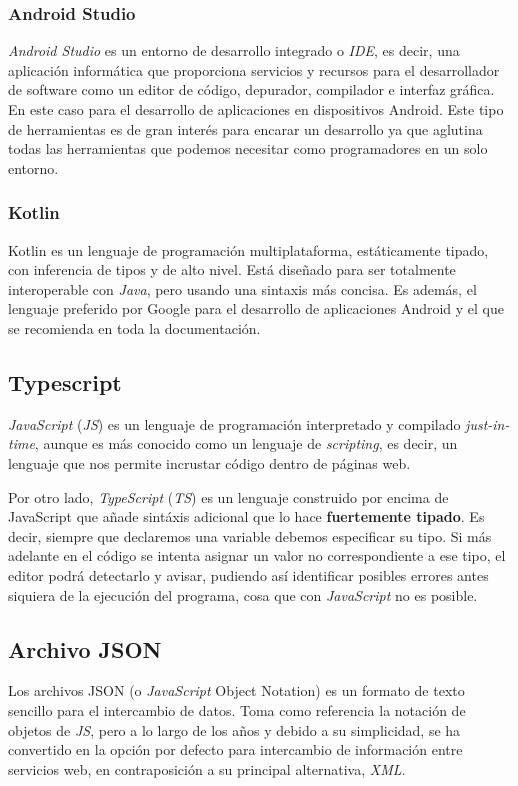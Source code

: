 \subsubsection{Android Studio}
\textit{Android Studio} es un entorno de desarrollo integrado o \textit{IDE}, es decir, una aplicación informática que proporciona servicios y recursos para el desarrollador de software como un editor de código, depurador, compilador e interfaz gráfica. En este caso para el desarrollo de aplicaciones en dispositivos Android. Este tipo de herramientas es de gran interés para encarar un desarrollo ya que aglutina todas las herramientas que podemos necesitar como programadores en un solo entorno.

\subsubsection{Kotlin}
Kotlin  es un lenguaje de programación multiplataforma, estáticamente tipado, con inferencia de tipos y de alto nivel. Está diseñado para ser totalmente interoperable con \textit{Java}, pero usando una sintaxis más concisa. Es además, el lenguaje preferido por Google para el desarrollo de aplicaciones Android y el que se recomienda en toda la documentación.

\subsection{Typescript}
\textit{JavaScript} (\textit{JS}) es un lenguaje de programación interpretado y compilado \textit{just-in-time}, aunque es más conocido como un lenguaje de \textit{scripting}, es decir, un lenguaje que nos permite incrustar código dentro de páginas web.

Por otro lado, \textit{TypeScript} (\textit{TS}) es un lenguaje construido por encima de JavaScript que añade sintáxis adicional que lo hace \textbf{fuertemente tipado}. Es decir, siempre que declaremos una variable debemos especificar su tipo. Si más adelante en el código se intenta asignar un valor no correspondiente a ese tipo, el editor podrá detectarlo y avisar, pudiendo así identificar posibles errores antes siquiera de la ejecución del programa, cosa que con \textit{JavaScript} no es posible.

\subsection{Archivo JSON}
Los archivos JSON (o \textit{JavaScript} Object Notation) es un formato de texto sencillo para el intercambio de datos. Toma como referencia la notación de objetos de \textit{JS}, pero a lo largo de los años y debido a su simplicidad, se ha convertido en la opción por defecto para intercambio de información entre servicios web, en contraposición a su principal alternativa, \textit{XML}.

